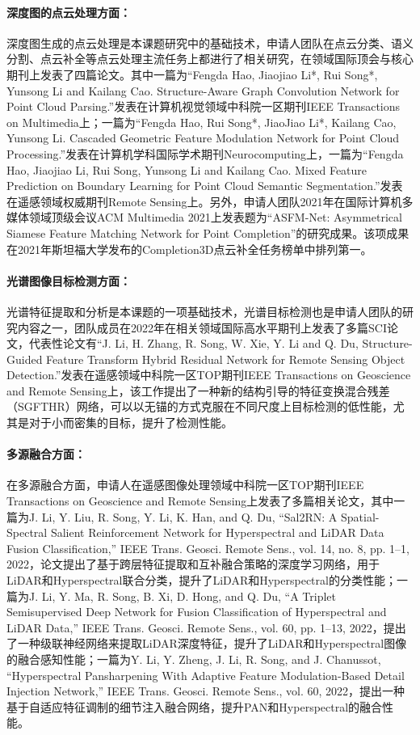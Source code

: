 \documentclass[12pt]{article}
\newcommand{\myPara}[1]{\paragraph{#1：}}
\begin{document}
\myPara{深度图的点云处理方面}
深度图生成的点云处理是本课题研究中的基础技术，申请人团队在点云分类、语义分割、点云补全等点云处理主流任务上都进行了相关研究，在领域国际顶会与核心期刊上发表了四篇论文。其中一篇为“Fengda Hao, Jiaojiao Li*, Rui Song*, Yunsong Li and Kailang Cao. Structure-Aware Graph Convolution Network for Point Cloud Parsing.”发表在计算机视觉领域中科院一区期刊IEEE Transactions on Multimedia上；一篇为“Fengda Hao, Rui Song*, JiaoJiao Li*, Kailang Cao, Yunsong Li. Cascaded Geometric Feature Modulation Network for Point Cloud Processing.”发表在计算机学科国际学术期刊Neurocomputing上，一篇为“Fengda Hao, Jiaojiao Li, Rui Song, Yunsong Li and Kailang Cao. Mixed Feature Prediction on Boundary Learning for Point Cloud Semantic Segmentation.”发表在遥感领域权威期刊Remote Sensing上。另外，申请人团队2021年在国际计算机多媒体领域顶级会议ACM Multimedia 2021上发表题为“ASFM-Net: Asymmetrical Siamese Feature Matching Network for Point Completion”的研究成果。该项成果在2021年斯坦福大学发布的Completion3D点云补全任务榜单中排列第一。

\myPara{光谱图像目标检测方面}
光谱特征提取和分析是本课题的一项基础技术，光谱目标检测也是申请人团队的研究内容之一，团队成员在2022年在相关领域国际高水平期刊上发表了多篇SCI论文，代表性论文有“J. Li, H. Zhang, R. Song, W. Xie, Y. Li and Q. Du, Structure-Guided Feature Transform Hybrid Residual Network for Remote Sensing Object Detection.”发表在遥感领域中科院一区TOP期刊IEEE Transactions on Geoscience and Remote Sensing上，该工作提出了一种新的结构引导的特征变换混合残差（SGFTHR）网络，可以以无锚的方式克服在不同尺度上目标检测的低性能，尤其是对于小而密集的目标，提升了检测性能。

\myPara{多源融合方面}
在多源融合方面，申请人在遥感图像处理领域中科院一区TOP期刊IEEE Transactions on Geoscience and Remote Sensing上发表了多篇相关论文，其中一篇为J. Li, Y. Liu, R. Song, Y. Li, K. Han, and Q. Du, “Sal2RN: A Spatial-Spectral Salient Reinforcement Network for Hyperspectral and LiDAR Data Fusion Classification,” IEEE Trans. Geosci. Remote Sens., vol. 14, no. 8, pp. 1–1, 2022，论文提出了基于跨层特征提取和互补融合策略的深度学习网络，用于LiDAR和Hyperspectral联合分类，提升了LiDAR和Hyperspectral的分类性能；一篇为J. Li, Y. Ma, R. Song, B. Xi, D. Hong, and Q. Du, “A Triplet Semisupervised Deep Network for Fusion Classification of Hyperspectral and LiDAR Data,” IEEE Trans. Geosci. Remote Sens., vol. 60, pp. 1–13, 2022，提出了一种级联神经网络来提取LiDAR深度特征，提升了LiDAR和Hyperspectral图像的融合感知性能；一篇为Y. Li, Y. Zheng, J. Li, R. Song, and J. Chanussot, “Hyperspectral Pansharpening With Adaptive Feature Modulation-Based Detail Injection Network,” IEEE Trans. Geosci. Remote Sens., vol. 60, 2022，提出一种基于自适应特征调制的细节注入融合网络，提升PAN和Hyperspectral的融合性能。
\end{document}
